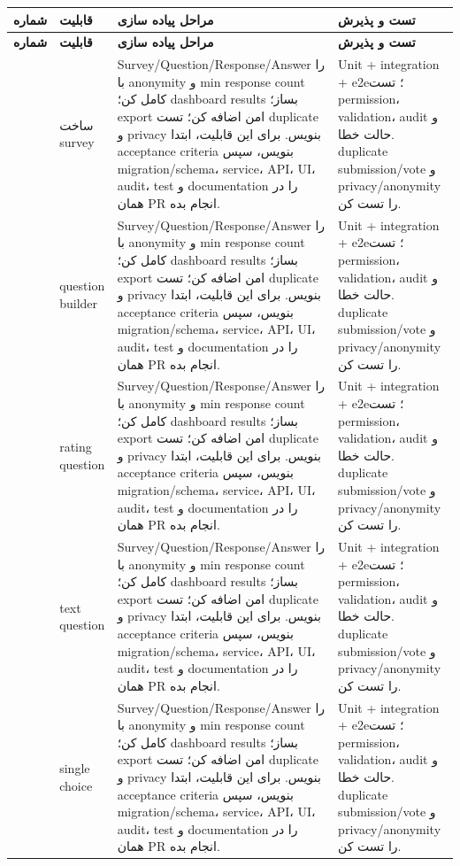 \documentclass[11pt,a4paper]{article}
\begin{document}
\begin{longtable}{|>{\raggedleft\arraybackslash}p{}|>{\raggedleft\arraybackslash}p{}|>{\raggedleft\arraybackslash}p{}|>{\raggedleft\arraybackslash}p{}|}
\hline
\textbf{شماره} & \textbf{قابلیت} & \textbf{مراحل پیاده سازی} & \textbf{تست و پذیرش} \\\hline
\endfirsthead
\hline
\textbf{شماره} & \textbf{قابلیت} & \textbf{مراحل پیاده سازی} & \textbf{تست و پذیرش} \\\hline
\endhead
161 & ساخت survey & Survey/Question/Response/Answer را با anonymity و min response count کامل کن؛ dashboard results بساز؛ export امن اضافه کن؛ تست duplicate و privacy بنویس. برای این قابلیت، ابتدا acceptance criteria بنویس، سپس migration/schema، service، API، UI، audit، test و documentation را در همان PR انجام بده. & Unit + integration + e2e؛ تست permission، validation، audit و حالت خطا. duplicate submission/vote و privacy/anonymity را تست کن. \\ \hline
162 & question builder & Survey/Question/Response/Answer را با anonymity و min response count کامل کن؛ dashboard results بساز؛ export امن اضافه کن؛ تست duplicate و privacy بنویس. برای این قابلیت، ابتدا acceptance criteria بنویس، سپس migration/schema، service، API، UI، audit، test و documentation را در همان PR انجام بده. & Unit + integration + e2e؛ تست permission، validation، audit و حالت خطا. duplicate submission/vote و privacy/anonymity را تست کن. \\ \hline
163 & rating question & Survey/Question/Response/Answer را با anonymity و min response count کامل کن؛ dashboard results بساز؛ export امن اضافه کن؛ تست duplicate و privacy بنویس. برای این قابلیت، ابتدا acceptance criteria بنویس، سپس migration/schema، service، API، UI، audit، test و documentation را در همان PR انجام بده. & Unit + integration + e2e؛ تست permission، validation، audit و حالت خطا. duplicate submission/vote و privacy/anonymity را تست کن. \\ \hline
164 & text question & Survey/Question/Response/Answer را با anonymity و min response count کامل کن؛ dashboard results بساز؛ export امن اضافه کن؛ تست duplicate و privacy بنویس. برای این قابلیت، ابتدا acceptance criteria بنویس، سپس migration/schema، service، API، UI، audit، test و documentation را در همان PR انجام بده. & Unit + integration + e2e؛ تست permission، validation، audit و حالت خطا. duplicate submission/vote و privacy/anonymity را تست کن. \\ \hline
165 & single choice & Survey/Question/Response/Answer را با anonymity و min response count کامل کن؛ dashboard results بساز؛ export امن اضافه کن؛ تست duplicate و privacy بنویس. برای این قابلیت، ابتدا acceptance criteria بنویس، سپس migration/schema، service، API، UI، audit، test و documentation را در همان PR انجام بده. & Unit + integration + e2e؛ تست permission، validation، audit و حالت خطا. duplicate submission/vote و privacy/anonymity را تست کن. \\ \hline

\end{longtable}
\end{document}
